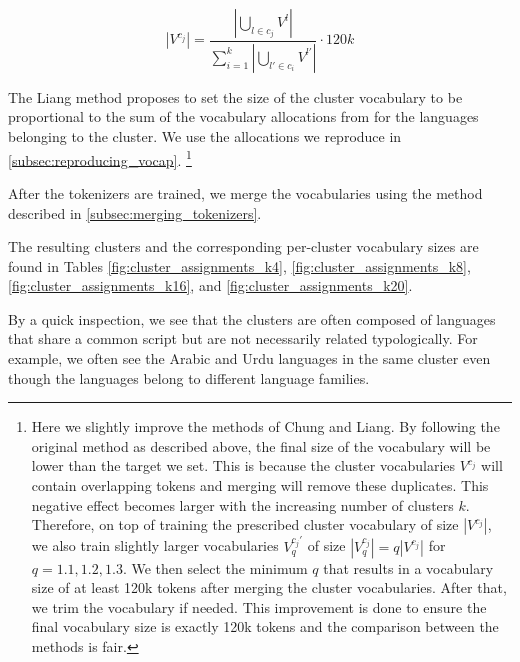 \begin{equation}
    |V^{c_j}| = \frac{|\bigcup_{l \in c_j} V^l|}{\sum_{i=1}^k |\bigcup_{l' \in c_i} V^{l'}|} \cdot 120k
\end{equation}

The Liang method proposes to set the size of the cluster vocabulary to be proportional to the sum of the vocabulary allocations from \citet{zheng_allocating_2021} for the languages belonging to the cluster. We use the allocations we reproduce in \autoref{subsec:reproducing_vocap}.
\footnote{
    Here we slightly improve the methods of Chung and Liang. By following the original method as described above, the final size of the vocabulary will be lower than the target we set. This is because the cluster vocabularies $V^{c_j}$ will contain overlapping tokens and merging will remove these duplicates. This negative effect becomes larger with the increasing number of clusters $k$. Therefore, on top of training the prescribed cluster vocabulary of size $|V^{c_j}|$, we also train slightly larger vocabularies $V_q^{c_j'}$ of size $|V_q^{c_j}| = q|V^{c_j}|$ for $q = 1.1, 1.2, 1.3$. We then select the minimum $q$ that results in a vocabulary size of at least 120k tokens after merging the cluster vocabularies. After that, we trim the vocabulary if needed. This improvement is done to ensure the final vocabulary size is exactly 120k tokens and the comparison between the methods is fair.
}

After the tokenizers are trained, we merge the vocabularies using the method described in \autoref{subsec:merging_tokenizers}. 

The resulting clusters and the corresponding per-cluster vocabulary sizes are found in Tables \ref{fig:cluster_assignments_k4}, \ref{fig:cluster_assignments_k8}, \ref{fig:cluster_assignments_k16}, and \ref{fig:cluster_assignments_k20}. 

By a quick inspection, we see that the clusters are often composed of languages that share a common script but are not necessarily related typologically. For example, we often see the Arabic and Urdu languages in the same cluster even though the languages belong to different language families.

